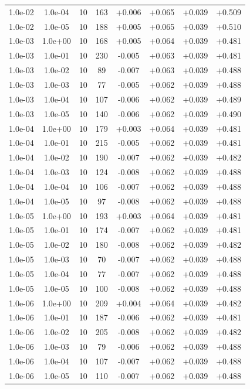 \documentclass[11pt,a4paper]{article}
\begin{document}
\begin{table}
{\begin{tabular}{*{8}c}
 1.0e-02 	 & 1.0e-04 	 & 10 & 163 	 & +0.006 & +0.065 & +0.039 & +0.509 \\ 
 1.0e-02 	 & 1.0e-05 	 & 10 & 188 	 & +0.005 & +0.065 & +0.039 & +0.510 \\ 
 1.0e-03 	 & 1.0e+00 	 & 10 & 168 	 & +0.005 & +0.064 & +0.039 & +0.481 \\ 
 1.0e-03 	 & 1.0e-01 	 & 10 & 230 	 & -0.005 & +0.063 & +0.039 & +0.481 \\ 
 1.0e-03 	 & 1.0e-02 	 & 10 & 89 	 & -0.007 & +0.063 & +0.039 & +0.488 \\ 
 1.0e-03 	 & 1.0e-03 	 & 10 & 77 	 & -0.005 & +0.062 & +0.039 & +0.488 \\ 
 1.0e-03 	 & 1.0e-04 	 & 10 & 107 	 & -0.006 & +0.062 & +0.039 & +0.489 \\ 
 1.0e-03 	 & 1.0e-05 	 & 10 & 140 	 & -0.006 & +0.062 & +0.039 & +0.490 \\ 
 1.0e-04 	 & 1.0e+00 	 & 10 & 179 	 & +0.003 & +0.064 & +0.039 & +0.481 \\ 
 1.0e-04 	 & 1.0e-01 	 & 10 & 215 	 & -0.005 & +0.062 & +0.039 & +0.481 \\ 
 1.0e-04 	 & 1.0e-02 	 & 10 & 190 	 & -0.007 & +0.062 & +0.039 & +0.482 \\ 
 1.0e-04 	 & 1.0e-03 	 & 10 & 124 	 & -0.008 & +0.062 & +0.039 & +0.488 \\ 
 1.0e-04 	 & 1.0e-04 	 & 10 & 106 	 & -0.007 & +0.062 & +0.039 & +0.488 \\ 
 1.0e-04 	 & 1.0e-05 	 & 10 & 97 	 & -0.008 & +0.062 & +0.039 & +0.488 \\ 
 1.0e-05 	 & 1.0e+00 	 & 10 & 193 	 & +0.003 & +0.064 & +0.039 & +0.481 \\ 
 1.0e-05 	 & 1.0e-01 	 & 10 & 174 	 & -0.007 & +0.062 & +0.039 & +0.481 \\ 
 1.0e-05 	 & 1.0e-02 	 & 10 & 180 	 & -0.008 & +0.062 & +0.039 & +0.482 \\ 
 1.0e-05 	 & 1.0e-03 	 & 10 & 70 	 & -0.007 & +0.062 & +0.039 & +0.488 \\ 
 1.0e-05 	 & 1.0e-04 	 & 10 & 77 	 & -0.007 & +0.062 & +0.039 & +0.488 \\ 
 1.0e-05 	 & 1.0e-05 	 & 10 & 100 	 & -0.008 & +0.062 & +0.039 & +0.488 \\ 
 1.0e-06 	 & 1.0e+00 	 & 10 & 209 	 & +0.004 & +0.064 & +0.039 & +0.482 \\ 
 1.0e-06 	 & 1.0e-01 	 & 10 & 187 	 & -0.006 & +0.062 & +0.039 & +0.481 \\ 
 1.0e-06 	 & 1.0e-02 	 & 10 & 205 	 & -0.008 & +0.062 & +0.039 & +0.482 \\ 
 1.0e-06 	 & 1.0e-03 	 & 10 & 79 	 & -0.006 & +0.062 & +0.039 & +0.488 \\ 
 1.0e-06 	 & 1.0e-04 	 & 10 & 107 	 & -0.007 & +0.062 & +0.039 & +0.488 \\ 
 1.0e-06 	 & 1.0e-05 	 & 10 & 110 	 & -0.007 & +0.062 & +0.039 & +0.488 \\ 
\end{tabular}}
\label{Tab::1}
\end{table} 
\end{document}
